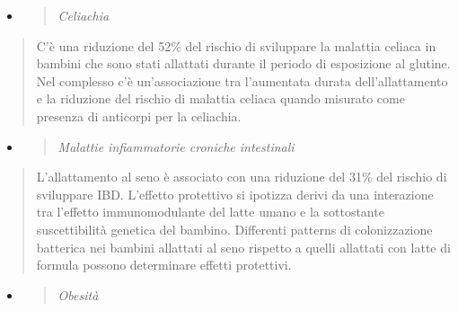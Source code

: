 \documentclass[]{article}
\begin{document}
\begin{itemize}
\item
  \begin{quote}
  \emph{Celiachia }
  \end{quote}
\end{itemize}

\begin{quote}
C'è una riduzione del 52\% del rischio di sviluppare la malattia celiaca
in bambini che sono stati allattati durante il periodo di esposizione al
glutine. Nel complesso c'è un'associazione tra l'aumentata durata
dell'allattamento e la riduzione del rischio di malattia celiaca quando
misurato come presenza di anticorpi per la celiachia.
\end{quote}

\begin{itemize}
\item
  \begin{quote}
  \emph{Malattie infiammatorie croniche intestinali }
  \end{quote}
\end{itemize}

\begin{quote}
L'allattamento al seno è associato con una riduzione del 31\% del
rischio di sviluppare IBD. L'effetto protettivo si ipotizza derivi da
una interazione tra l'effetto immunomodulante del latte umano e la
sottostante suscettibilità genetica del bambino. Differenti patterns di
colonizzazione batterica nei bambini allattati al seno rispetto a quelli
allattati con latte di formula possono determinare effetti protettivi.
\end{quote}

\begin{itemize}
\item
  \begin{quote}
  \emph{Obesità}
  \end{quote}
\end{itemize}
\end{document}
